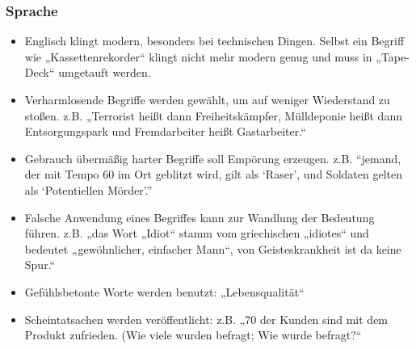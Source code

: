 \subsubsection{Sprache}
\begin{itemize}
	\item Englisch klingt modern, besonders bei technischen Dingen. Selbst ein Begriff wie
„Kassettenrekorder“ klingt nicht mehr modern genug und muss in „Tape-Deck“ umgetauft werden.

	\item Verharmlosende Begriffe werden gewählt, um auf weniger Wiederstand zu stoßen.
z.B. „Terrorist heißt dann Freiheitskämpfer, Mülldeponie heißt dann Entsorgungspark und Fremdarbeiter
heißt Gastarbeiter.“

	\item Gebrauch übermäßig harter Begriffe soll Empörung erzeugen.
z.B. \enquote{jemand, der mit Tempo 60 im Ort geblitzt wird, gilt als \enquote{Raser}, und Soldaten
gelten als \enquote{Potentiellen Mörder}.}

	\item Falsche Anwendung eines Begriffes kann zur Wandlung der Bedeutung führen.
z.B. „das Wort „Idiot“ stamm vom griechischen „idiotes“ und bedeutet „gewöhnlicher, einfacher Mann“,
von Geisteskrankheit ist da keine Spur.“

	\item Gefühlsbetonte Worte werden benutzt: „Lebensqualität“
	\item Scheintatsachen werden veröffentlicht:
z.B. „70\Prozent{} der Kunden sind mit dem Produkt zufrieden. (Wie viele wurden befragt; Wie wurde
befragt?“
\end{itemize}

